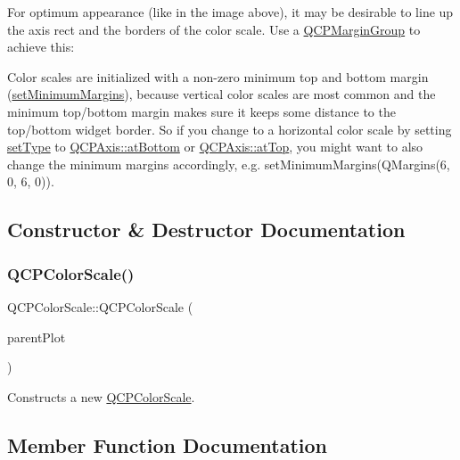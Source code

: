 For optimum appearance (like in the image above), it may be desirable to line up the axis rect and the borders of the color scale. Use a \hyperlink{class_q_c_p_margin_group}{Q\+C\+P\+Margin\+Group} to achieve this\+: 
\begin{DoxyCodeInclude}
\end{DoxyCodeInclude}
 Color scales are initialized with a non-\/zero minimum top and bottom margin (\hyperlink{class_q_c_p_layout_element_a0a8a17abc16b7923159fcc7608f94673}{set\+Minimum\+Margins}), because vertical color scales are most common and the minimum top/bottom margin makes sure it keeps some distance to the top/bottom widget border. So if you change to a horizontal color scale by setting \hyperlink{class_q_c_p_color_scale_a1bf9bdb291927c422dd66b404b206f1f}{set\+Type} to \hyperlink{class_q_c_p_axis_ae2bcc1728b382f10f064612b368bc18aa220d68888516b6c3b493d144f1ba438f}{Q\+C\+P\+Axis\+::at\+Bottom} or \hyperlink{class_q_c_p_axis_ae2bcc1728b382f10f064612b368bc18aac0ece2b680d3f545e701f75af1655977}{Q\+C\+P\+Axis\+::at\+Top}, you might want to also change the minimum margins accordingly, e.\+g. {\ttfamily set\+Minimum\+Margins(\+Q\+Margins(6, 0, 6, 0))}. 

\subsection{Constructor \& Destructor Documentation}
\mbox{\label{class_q_c_p_color_scale_aa8debce1be38b54287c04d4f584394b4}} 
\subsubsection{\texorpdfstring{Q\+C\+P\+Color\+Scale()}{QCPColorScale()}}
{\footnotesize\ttfamily Q\+C\+P\+Color\+Scale\+::\+Q\+C\+P\+Color\+Scale (\begin{DoxyParamCaption}\item[{\hyperlink{class_q_custom_plot}{Q\+Custom\+Plot} $\ast$}]{parent\+Plot }\end{DoxyParamCaption})\hspace{0.3cm}{\ttfamily [explicit]}}

Constructs a new \hyperlink{class_q_c_p_color_scale}{Q\+C\+P\+Color\+Scale}. 

\subsection{Member Function Documentation}
\mbox{\label{class_q_c_p_color_scale_a39bdbdb3b212602a5a57f9f3ea444190}} 
